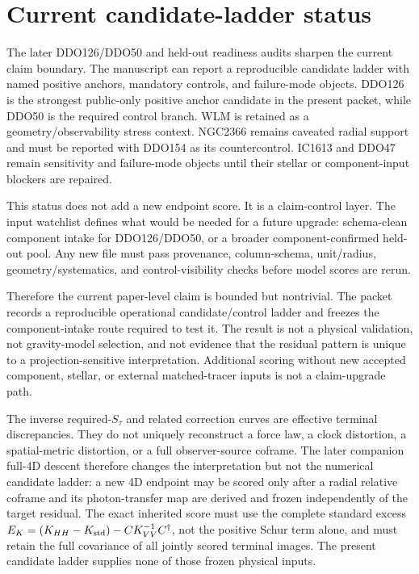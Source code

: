 \documentclass[11pt]{article}
\begin{document}
\section{Current candidate-ladder status}

The later DDO126/DDO50 and held-out readiness audits sharpen the current claim boundary. The manuscript can report a reproducible candidate ladder with named positive anchors, mandatory controls, and failure-mode objects. DDO126 is the strongest public-only positive anchor candidate in the present packet, while DDO50 is the required control branch. WLM is retained as a geometry/observability stress context. NGC2366 remains caveated radial support and must be reported with DDO154 as its countercontrol. IC1613 and DDO47 remain sensitivity and failure-mode objects until their stellar or component-input blockers are repaired.

This status does not add a new endpoint score. It is a claim-control layer. The input watchlist defines what would be needed for a future upgrade: schema-clean component intake for DDO126/DDO50, or a broader component-confirmed held-out pool. Any new file must pass provenance, column-schema, unit/radius, geometry/systematics, and control-visibility checks before model scores are rerun.

Therefore the current paper-level claim is bounded but nontrivial. The packet records a reproducible operational candidate/control ladder and freezes the component-intake route required to test it. The result is not a physical validation, not gravity-model selection, and not evidence that the residual pattern is unique to a projection-sensitive interpretation. Additional scoring without new accepted component, stellar, or external matched-tracer inputs is not a claim-upgrade path.

The inverse required-$S_\tau$ and related correction curves are effective terminal discrepancies.  They do not uniquely reconstruct a force law, a clock distortion, a spatial-metric distortion, or a full observer-source coframe.  The later companion full-4D descent therefore changes the interpretation but not the numerical candidate ladder: a new 4D endpoint may be scored only after a radial relative coframe and its photon-transfer map are derived and frozen independently of the target residual.  The exact inherited score must use the complete standard excess $E_K=(K_{HH}-K_{\rm std})-CK_{VV}^{-1}C^\dagger$, not the positive Schur term alone, and must retain the full covariance of all jointly scored terminal images.  The present candidate ladder supplies none of those frozen physical inputs.
\end{document}
